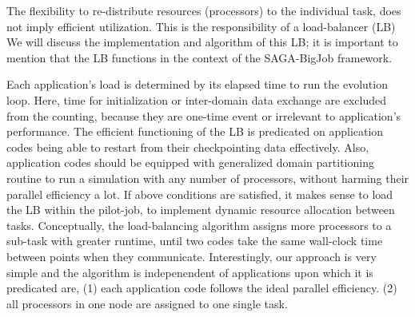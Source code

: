 \documentclass[conference,final]{IEEEtran}
\begin{document}


The flexibility to re-distribute resources (processors) to the
individual task, does not imply efficient utilization. This is the
responsibility of a load-balancer (LB) We will discuss the
implementation and algorithm of this LB; it is important to mention
that the LB functions in the context of the SAGA-BigJob framework.

Each application's load is determined by its elapsed time to run the
evolution loop. Here, time for initialization or inter-domain data
exchange are excluded from the counting, because they are one-time
event or irrelevant to application's performance.  The efficient
functioning of the LB is predicated on application codes being able to
restart from their checkpointing data effectively.  Also, application codes should be equipped with generalized domain partitioning routine to run
a simulation with any number of processors, without harming their
parallel efficiency a lot. If above conditions are satisfied, it makes
sense to load the LB within the pilot-job, to implement dynamic
resource allocation between tasks.  Conceptually, the load-balancing
algorithm assigns more processors to a sub-task with greater runtime,
until two codes take the same wall-clock time between points when they
communicate. Interestingly, our approach is very simple and the
algorithm is indepenendent of applications upon which it is predicated
are, (1) each application code follows the ideal parallel efficiency.
(2) all processors in one node are assigned to one single task.
\end{document}
